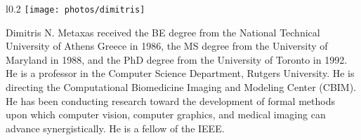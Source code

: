 \documentclass[10pt,journal,letterpaper,compsoc]{IEEEtran}
\begin{document}
\vspace{+5pt}
\begin{wrapfigure}{l}{0.2\columnwidth}
\texttt{[image: photos/dimitris]}
\end{wrapfigure}
Dimitris N. Metaxas received the BE degree from the National Technical University of Athens Greece in 1986, the MS degree from the University
of Maryland in 1988, and the PhD degree from the University of Toronto in 1992. He is a professor in the Computer Science Department, Rutgers University. He is directing the Computational Biomedicine Imaging and Modeling Center
(CBIM). He has been conducting research toward the development of formal methods upon which computer vision, computer graphics, and medical imaging can advance synergistically. He is a fellow of the IEEE.
\end{document}
